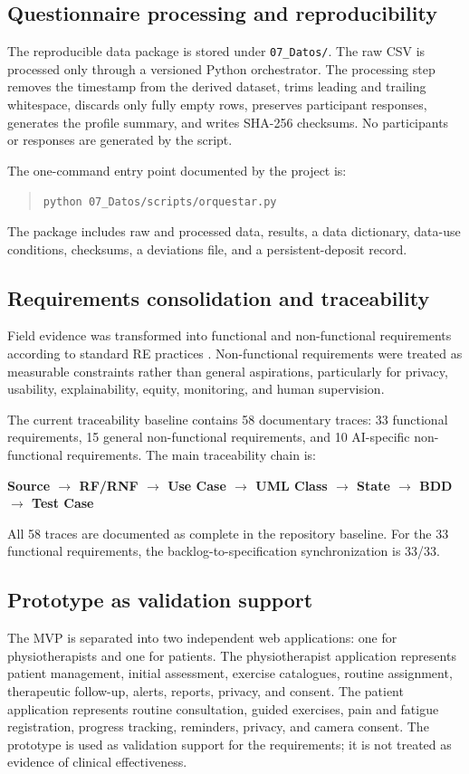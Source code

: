 \documentclass[pdflatex,sn-basic]{sn-jnl}
\begin{document}
\subsection{Questionnaire processing and reproducibility}
The reproducible data package is stored under \texttt{07\_Datos/}. The raw CSV is processed only through a versioned Python orchestrator. The processing step removes the timestamp from the derived dataset, trims leading and trailing whitespace, discards only fully empty rows, preserves participant responses, generates the profile summary, and writes SHA-256 checksums. No participants or responses are generated by the script.

The one-command entry point documented by the project is:

\begin{quote}
\texttt{python 07\_Datos/scripts/orquestar.py}
\end{quote}

The package includes raw and processed data, results, a data dictionary, data-use conditions, checksums, a deviations file, and a persistent-deposit record.

\subsection{Requirements consolidation and traceability}
Field evidence was transformed into functional and non-functional requirements according to standard RE practices \citep{iso29148_2018,pohl2010requirements}. Non-functional requirements were treated as measurable constraints rather than general aspirations, particularly for privacy, usability, explainability, equity, monitoring, and human supervision.

The current traceability baseline contains 58 documentary traces: 33 functional requirements, 15 general non-functional requirements, and 10 AI-specific non-functional requirements. The main traceability chain is:

\begin{center}
\textbf{Source $\rightarrow$ RF/RNF $\rightarrow$ Use Case $\rightarrow$ UML Class $\rightarrow$ State $\rightarrow$ BDD $\rightarrow$ Test Case}
\end{center}

All 58 traces are documented as complete in the repository baseline. For the 33 functional requirements, the backlog-to-specification synchronization is 33/33.

\subsection{Prototype as validation support}
The MVP is separated into two independent web applications: one for physiotherapists and one for patients. The physiotherapist application represents patient management, initial assessment, exercise catalogues, routine assignment, therapeutic follow-up, alerts, reports, privacy, and consent. The patient application represents routine consultation, guided exercises, pain and fatigue registration, progress tracking, reminders, privacy, and camera consent. The prototype is used as validation support for the requirements; it is not treated as evidence of clinical effectiveness.
\end{document}
